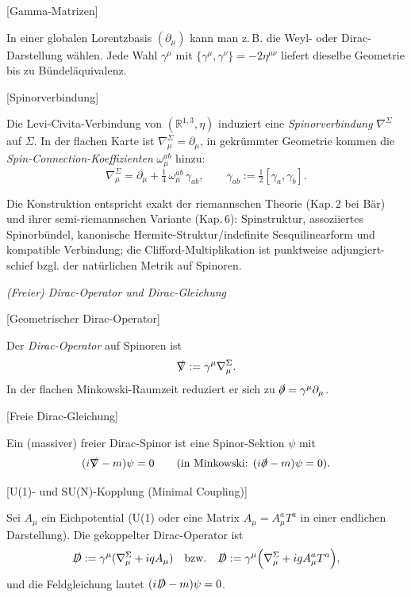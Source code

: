 \documentclass[10pt, letterpaper]{article}
\newcommand{\R}{\mathbb{R}}
\begin{document}
[Gamma-Matrizen]

In einer globalen Lorentzbasis $(\partial_\mu)$ kann man z.\,B. die Weyl- oder Dirac-Darstellung wählen. Jede Wahl $\gamma^\mu$ mit
\(\{\gamma^\mu,\gamma^\nu\}=-2\eta^{\mu\nu}\)
liefert dieselbe Geometrie bis zu Bündeläquivalenz.




[Spinorverbindung]

Die Levi-Civita-Verbindung von $(\R^{1,3},\eta)$ induziert eine \emph{Spinorverbindung} 
\(\nabla^\Sigma\) auf \(\Sigma\).
In der flachen Karte ist \(\nabla^\Sigma_\mu=\partial_\mu\), in gekrümmter Geometrie kommen die \emph{Spin-Connection-Koeffizienten} \(\omega_{\mu}^{ab}\) hinzu:
\[
\nabla^\Sigma_\mu = \partial_\mu + \tfrac{1}{4}\,\omega_{\mu}^{ab}\,\gamma_{ab},\qquad \gamma_{ab}:=\tfrac{1}{2}[\gamma_a,\gamma_b].
\]



Die Konstruktion entspricht exakt der riemannschen Theorie (Kap.\,2 bei Bär) und ihrer semi-riemannschen Variante (Kap.\,6): Spinstruktur, assoziiertes Spinorbündel, kanonische Hermite-Struktur/indefinite Sesquilinearform und kompatible Verbindung; die Clifford-Multiplikation ist punktweise adjungiert-schief bzgl. der natürlichen Metrik auf Spinoren.


\emph{(Freier) Dirac-Operator und Dirac-Gleichung}



[Geometrischer Dirac-Operator]

Der \emph{Dirac-Operator} auf Spinoren ist
\[
\slashed{\nabla}:=\gamma^\mu\nabla^\Sigma_\mu.
\]
In der flachen Minkowski-Raumzeit reduziert er sich zu \(\slashed{\partial}=\gamma^\mu\partial_\mu\).



[Freie Dirac-Gleichung]

Ein (massiver) freier Dirac-Spinor ist eine Spinor-Sektion \(\psi\) mit
\[
(i\slashed{\nabla}-m)\psi=0\qquad
(\text{in Minkowski: } (i\slashed{\partial}-m)\psi=0).
\]



[U(1)- und SU(N)-Kopplung (Minimal Coupling)]

Sei \(A_\mu\) ein Eichpotential (U(1) oder eine Matrix \(A_\mu=A_\mu^a T^a\) in einer endlichen Darstellung). Die gekoppelter Dirac-Operator ist
\[
\slashed{D}:=\gamma^\mu(\nabla^\Sigma_\mu + i q A_\mu)\quad\text{bzw.}\quad 
\slashed{D}:=\gamma^\mu\Big(\nabla^\Sigma_\mu + i g A_\mu^a T^a\Big),
\]
und die Feldgleichung lautet \((i\slashed{D}-m)\psi=0\).
\end{document}
